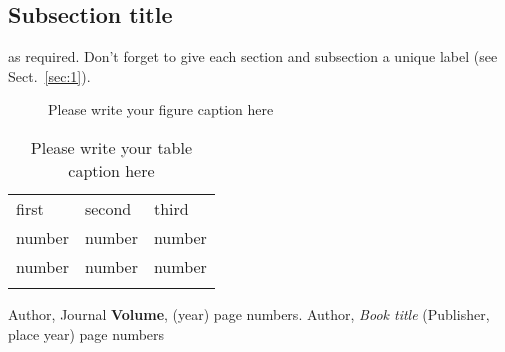\subsection{Subsection title}
\label{sec:2}
as required. Don't forget to give each section
and subsection a unique label (see Sect.~\ref{sec:1}).
%
\begin{figure}
\centering
{}
\caption{Please write your figure caption here}
\label{fig:1}       %
\end{figure}
%
\begin{table}
\caption{Please write your table caption here}
\label{tab:1}       %
\centering
\begin{tabular}{lll}
\hline\noalign{\smallskip}
first & second & third  \\
\noalign{\smallskip}\hline\noalign{\smallskip}
number & number & number \\
number & number & number \\
\noalign{\smallskip}\hline
\end{tabular}
\end{table}
%
% 
% 
%
\begin{thebibliography}{}
%
%
Author, Journal \textbf{Volume}, (year) page numbers.
Author, \textit{Book title} (Publisher, place year) page numbers
\end{thebibliography}





